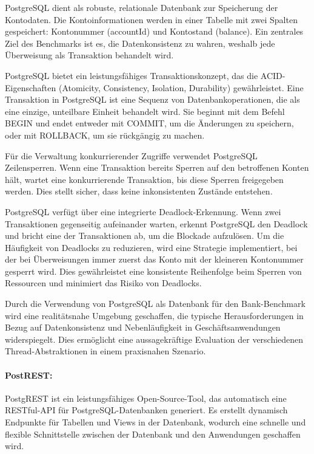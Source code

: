 \documentclass[fontsize=12pt,paper=a4,twoside=semi,parskip=half-,headsepline,headinclude]{scrreprt}
\begin{document}
PostgreSQL dient als robuste, relationale Datenbank zur Speicherung der Kontodaten. Die Kontoinformationen werden in einer Tabelle mit zwei Spalten gespeichert: Kontonummer (accountId) und Kontostand (balance). Ein zentrales Ziel des Benchmarks ist es, die Datenkonsistenz zu wahren, weshalb jede Überweisung als Transaktion behandelt wird.

PostgreSQL bietet ein leistungsfähiges Transaktionskonzept, das die ACID-Eigenschaften (Atomicity, Consistency, Isolation, Durability) gewährleistet. Eine Transaktion in PostgreSQL ist eine Sequenz von Datenbankoperationen, die als eine einzige, unteilbare Einheit behandelt wird. Sie beginnt mit dem Befehl BEGIN und endet entweder mit COMMIT, um die Änderungen zu speichern, oder mit ROLLBACK, um sie rückgängig zu machen.

Für die Verwaltung konkurrierender Zugriffe verwendet PostgreSQL Zeilensperren. Wenn eine Transaktion bereits Sperren auf den betroffenen Konten hält, wartet eine konkurrierende Transaktion, bis diese Sperren freigegeben werden. Dies stellt sicher, dass keine inkonsistenten Zustände entstehen.

PostgreSQL verfügt über eine integrierte Deadlock-Erkennung. Wenn zwei Transaktionen gegenseitig aufeinander warten, erkennt PostgreSQL den Deadlock und bricht eine der Transaktionen ab, um die Blockade aufzulösen.
Um die Häufigkeit von Deadlocks zu reduzieren, wird eine Strategie implementiert, bei der bei Überweisungen immer zuerst das Konto mit der kleineren Kontonummer gesperrt wird. Dies gewährleistet eine konsistente Reihenfolge beim Sperren von Ressourcen und minimiert das Risiko von Deadlocks.

Durch die Verwendung von PostgreSQL als Datenbank für den Bank-Benchmark wird eine realitätsnahe Umgebung geschaffen, die typische Herausforderungen in Bezug auf Datenkonsistenz und Nebenläufigkeit in Geschäftsanwendungen widerspiegelt. Dies er\-mög\-licht eine aussagekräftige Evaluation der verschiedenen Thread-Abstraktionen in einem praxisnahen Szenario.

\paragraph{PostREST:}

PostgREST ist ein leistungsfähiges Open-Source-Tool, das automatisch eine RESTful-API für PostgreSQL-Datenbanken generiert. Es erstellt dynamisch Endpunkte für Tabellen und Views in der Datenbank, wodurch eine schnelle und flexible Schnittstelle zwischen der Datenbank und den Anwendungen geschaffen wird.
\end{document}
